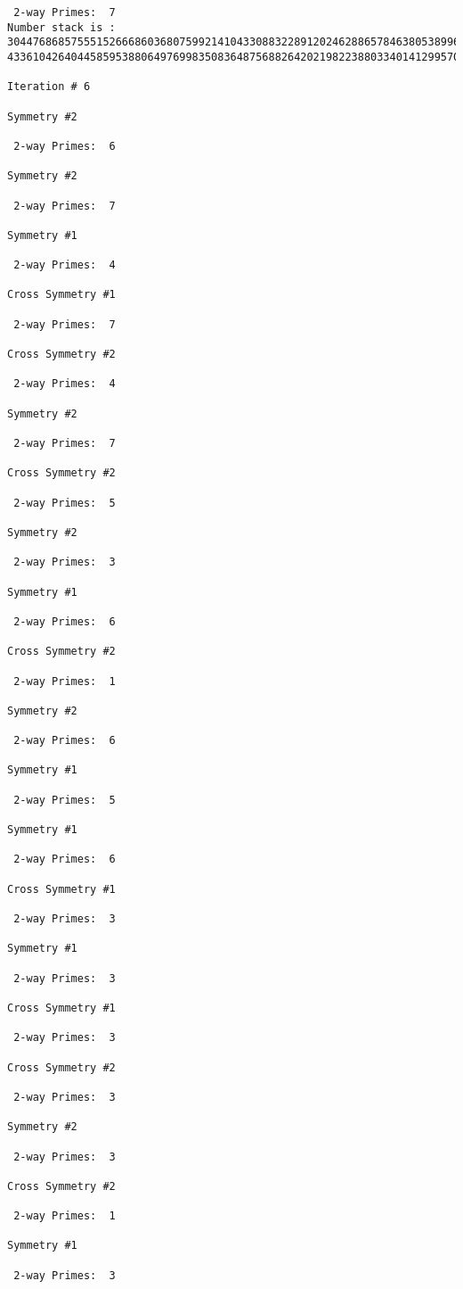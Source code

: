 {{{{\begin{verbatim}
 2-way Primes: 	7
Number stack is :
30447686857555152666860368075992141043308832289120246288657846380538996794608835958544046240163340857
43361042640445859538806497699835083648756882642021982238803340141299570863068666251555758686744037580

Iteration #	6

Symmetry #2

 2-way Primes: 	6

Symmetry #2

 2-way Primes: 	7

Symmetry #1

 2-way Primes: 	4

Cross Symmetry #1

 2-way Primes: 	7

Cross Symmetry #2

 2-way Primes: 	4

Symmetry #2

 2-way Primes: 	7

Cross Symmetry #2

 2-way Primes: 	5

Symmetry #2

 2-way Primes: 	3

Symmetry #1

 2-way Primes: 	6

Cross Symmetry #2

 2-way Primes: 	1

Symmetry #2

 2-way Primes: 	6

Symmetry #1

 2-way Primes: 	5

Symmetry #1

 2-way Primes: 	6

Cross Symmetry #1

 2-way Primes: 	3

Symmetry #1

 2-way Primes: 	3

Cross Symmetry #1

 2-way Primes: 	3

Cross Symmetry #2

 2-way Primes: 	3

Symmetry #2

 2-way Primes: 	3

Cross Symmetry #2

 2-way Primes: 	1

Symmetry #1

 2-way Primes: 	3


\end{verbatim}}}}}
